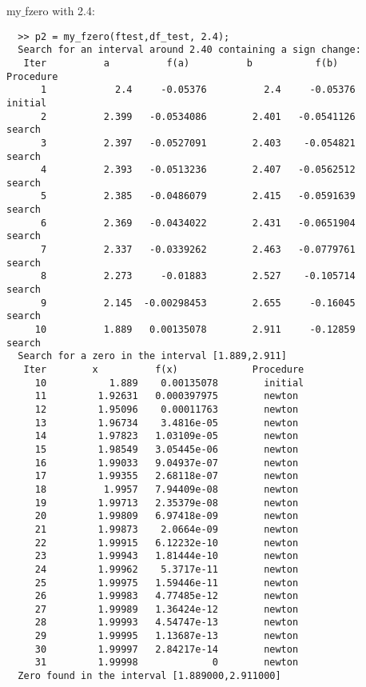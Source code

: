 \documentclass{article}
\begin{document}
my$\_$fzero with 2.4:
\begin{verbatim}
  >> p2 = my_fzero(ftest,df_test, 2.4);
  Search for an interval around 2.40 containing a sign change:
   Iter          a          f(a)          b           f(b)         Procedure
      1            2.4     -0.05376          2.4     -0.05376        initial
      2          2.399   -0.0534086        2.401   -0.0541126        search
      3          2.397   -0.0527091        2.403    -0.054821        search
      4          2.393   -0.0513236        2.407   -0.0562512        search
      5          2.385   -0.0486079        2.415   -0.0591639        search
      6          2.369   -0.0434022        2.431   -0.0651904        search
      7          2.337   -0.0339262        2.463   -0.0779761        search
      8          2.273     -0.01883        2.527    -0.105714        search
      9          2.145  -0.00298453        2.655     -0.16045        search
     10          1.889   0.00135078        2.911     -0.12859        search
  Search for a zero in the interval [1.889,2.911]
   Iter        x          f(x)             Procedure
     10           1.889    0.00135078        initial
     11         1.92631   0.000397975        newton
     12         1.95096    0.00011763        newton
     13         1.96734    3.4816e-05        newton
     14         1.97823   1.03109e-05        newton
     15         1.98549   3.05445e-06        newton
     16         1.99033   9.04937e-07        newton
     17         1.99355   2.68118e-07        newton
     18          1.9957   7.94409e-08        newton
     19         1.99713   2.35379e-08        newton
     20         1.99809   6.97418e-09        newton
     21         1.99873    2.0664e-09        newton
     22         1.99915   6.12232e-10        newton
     23         1.99943   1.81444e-10        newton
     24         1.99962    5.3717e-11        newton
     25         1.99975   1.59446e-11        newton
     26         1.99983   4.77485e-12        newton
     27         1.99989   1.36424e-12        newton
     28         1.99993   4.54747e-13        newton
     29         1.99995   1.13687e-13        newton
     30         1.99997   2.84217e-14        newton
     31         1.99998             0        newton
  Zero found in the interval [1.889000,2.911000]
\end{verbatim}
\end{document}
